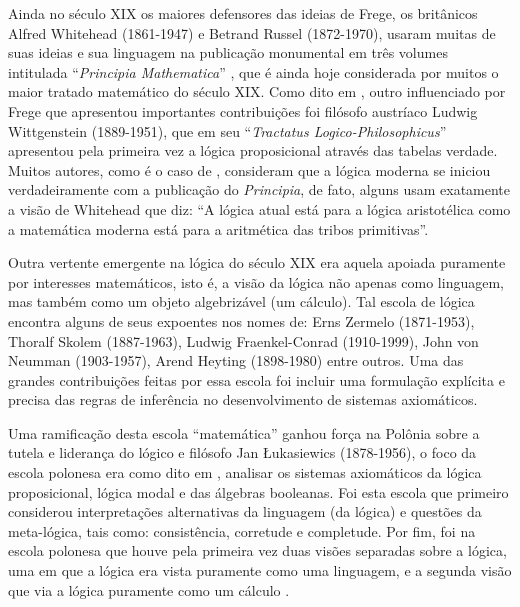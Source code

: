Ainda no século XIX os maiores defensores das ideias de Frege, os britânicos Alfred Whitehead (1861-1947) e Betrand Russel (1872-1970), usaram muitas de suas ideias e sua linguagem na publicação monumental em três volumes intitulada ``\textit{Principia Mathematica}'' \cite{russel1910principia}, que é ainda hoje considerada por muitos o maior tratado matemático do século XIX. Como dito em \cite{benja-Logica}, outro influenciado por Frege que apresentou importantes contribuições foi filósofo austríaco Ludwig Wittgenstein (1889-1951), que em seu ``\textit{Tractatus Logico-Philosophicus}'' apresentou pela primeira vez a lógica proposicional através das tabelas verdade. Muitos autores, como é o caso de \cite{abe2002-logica}, consideram que a lógica moderna se iniciou verdadeiramente com a publicação do \textit{Principia}, de fato, alguns usam exatamente a visão de Whitehead que diz: ``A lógica atual está para a lógica aristotélica como a matemática moderna está para a aritmética das tribos primitivas''.

Outra vertente emergente na lógica do século XIX era aquela apoiada puramente por interesses matemáticos, isto é, a visão da lógica não apenas como linguagem, mas também como um objeto algebrizável (um cálculo). Tal escola de lógica encontra alguns de seus expoentes nos nomes de: Erns Zermelo (1871-1953), Thoralf Skolem (1887-1963), Ludwig Fraenkel-Conrad (1910-1999), John von Neumman (1903-1957), Arend Heyting (1898-1980) entre outros. Uma das grandes contribuições feitas por essa escola foi incluir uma formulação explícita e precisa das regras de inferência no desenvolvimento de sistemas axiomáticos.

Uma ramificação desta escola ``matemática'' ganhou força na Polônia sobre a tutela e liderança do lógico e filósofo Jan \L{}ukasiewics (1878-1956), o foco da escola polonesa era como dito em \cite{benja-Logica}, analisar os sistemas axiomáticos da lógica proposicional, lógica modal e das álgebras booleanas. Foi esta escola que primeiro considerou interpretações alternativas da linguagem (da lógica) e questões da meta-lógica, tais como: consistência, corretude e completude. Por fim, foi na escola polonesa que houve pela primeira vez duas visões separadas sobre a lógica, uma em que a lógica era vista puramente como uma linguagem, e a segunda visão que via a lógica puramente como um cálculo \cite{benja-Logica}.

